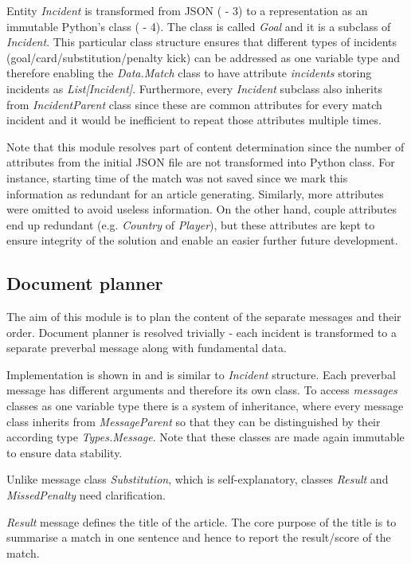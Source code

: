 Entity \emph{Incident} is transformed from JSON ( - 3) to a representation as an immutable Python's class ( - 4). The class is called \emph{Goal} and it is a subclass of \emph{Incident}. This particular class structure ensures that different types of incidents (goal/card/substitution/penalty kick) can be addressed as one variable type and therefore enabling the \textit{Data.Match} class to have attribute \textit{incidents} storing incidents as \emph{List[Incident]}. Furthermore, every \textit{Incident} subclass also inherits from \emph{IncidentParent} class since these are common attributes for every match incident and it would be inefficient to repeat those attributes multiple times.

Note that this module resolves part of content determination since the number of attributes from the initial JSON file are not transformed into Python class. For instance, starting time of the match was not saved since we mark this information as redundant for an article generating. Similarly, more attributes were omitted to avoid useless information. On the other hand, couple attributes end up redundant (e.g. \textit{Country} of \textit{Player}), but these attributes are kept to ensure integrity of the solution and enable an easier further future development. 

\subsection{Document planner}

The aim of this module is to plan the content of the separate messages and their order. Document planner is resolved trivially - each incident is transformed to a separate preverbal message along with fundamental data. 

Implementation is shown in  and is similar to \textit{Incident} structure. Each preverbal message has different arguments and therefore its own class. To access \textit{messages} classes as one variable type there is a system of inheritance, where every message class inherits from \textit{MessageParent} so that they can be distinguished by their according type \textit{Types.Message}. Note that these classes are made again immutable to ensure data stability.

Unlike message class \textit{Substitution}, which is self-explanatory, classes \textit{Result} and \textit{MissedPenalty} need clarification. 

\textit{Result} message defines the title of the article. The core purpose of the title is to summarise a match in one sentence and hence to report the result/score of the match. 

